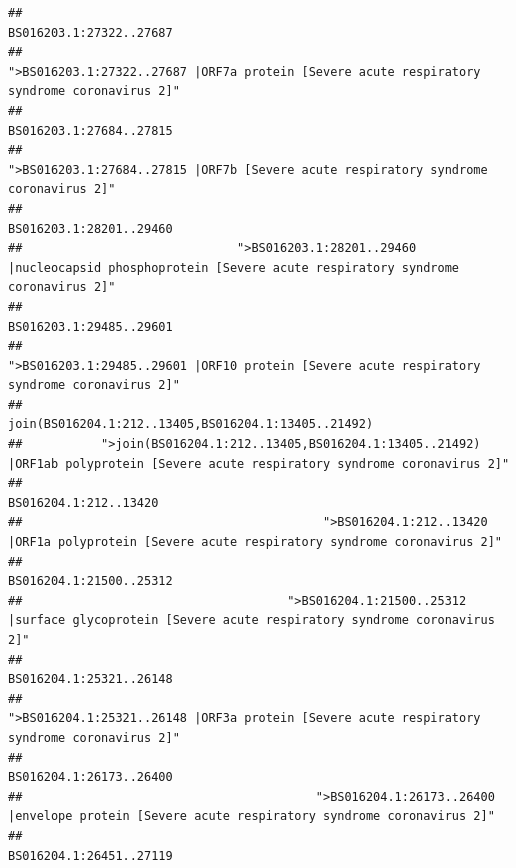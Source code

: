 \documentclass[
]{article}
\begin{document}
\begin{verbatim}
##                                                                                                                BS016203.1:27322..27687 
##                                            ">BS016203.1:27322..27687 |ORF7a protein [Severe acute respiratory syndrome coronavirus 2]" 
##                                                                                                                BS016203.1:27684..27815 
##                                                    ">BS016203.1:27684..27815 |ORF7b [Severe acute respiratory syndrome coronavirus 2]" 
##                                                                                                                BS016203.1:28201..29460 
##                              ">BS016203.1:28201..29460 |nucleocapsid phosphoprotein [Severe acute respiratory syndrome coronavirus 2]" 
##                                                                                                                BS016203.1:29485..29601 
##                                            ">BS016203.1:29485..29601 |ORF10 protein [Severe acute respiratory syndrome coronavirus 2]" 
##                                                                                    join(BS016204.1:212..13405,BS016204.1:13405..21492) 
##           ">join(BS016204.1:212..13405,BS016204.1:13405..21492) |ORF1ab polyprotein [Severe acute respiratory syndrome coronavirus 2]" 
##                                                                                                                  BS016204.1:212..13420 
##                                          ">BS016204.1:212..13420 |ORF1a polyprotein [Severe acute respiratory syndrome coronavirus 2]" 
##                                                                                                                BS016204.1:21500..25312 
##                                     ">BS016204.1:21500..25312 |surface glycoprotein [Severe acute respiratory syndrome coronavirus 2]" 
##                                                                                                                BS016204.1:25321..26148 
##                                            ">BS016204.1:25321..26148 |ORF3a protein [Severe acute respiratory syndrome coronavirus 2]" 
##                                                                                                                BS016204.1:26173..26400 
##                                         ">BS016204.1:26173..26400 |envelope protein [Severe acute respiratory syndrome coronavirus 2]" 
##                                                                                                                BS016204.1:26451..27119 

\end{verbatim}
\end{document}

